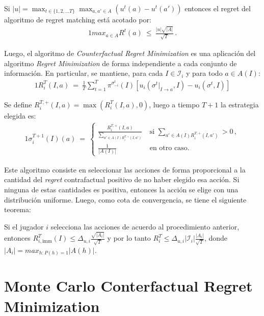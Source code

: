 \begin{theorem}
Si $|u| = \max_{t \in \{1, 2, ... T\}} \max_{a, a' \in A}(u^t(a) - u^t(a'))$ entonces el regret del algoritmo de regret matching está acotado por:
\begin{alignat}{1}
max_{a \in A}R^t(a)\ \leq\ \frac{|u| \sqrt{|A|}}{\sqrt T} \,.
\end{alignat}
\end{theorem}

Luego, el algoritmo de \textit{Counterfactual Regret Minimization} es una aplicación del algoritmo \textit{Regret Minimization} de forma independiente a cada conjunto de información. En particular, se mantiene, para cada $I \in \mathcal{I}_i$ y para todo $a \in A(I)$:
\begin{alignat}{1}
R_i^T(I, a)\ =\ \frac{1}{T} \sum_{t = 1}^T \pi^{\sigma^t_{-i}}(I)[u_i(\sigma^t|_{I \rightarrow a}, I) - u_i(\sigma^t, I)]
\end{alignat}

Se define $R_i^{T, +}(I, a) = \max(R_i^T(I, a), 0)$, luego a tiempo $T+1$ la estrategia elegida es:
\begin{alignat}{1}
\sigma_i^{T+1}(I)(a)\ =\
\begin{cases}
\frac{R_i^{T, +}(I, a)}{\sum_{a' \in A(I) R_i^{T, +}(I, a')}}\ & \text{si } \sum_{a' \in A(I) R_i^{T, +}(I, a')} > 0 \,, \\
\frac{1}{|A(I)|}\ & \text{en otro caso.} 
\end{cases}
\end{alignat}

Este algoritmo consiste en seleccionar las acciones de forma proporcional a la cantidad del \textit{regret} contrafactual positivo de no haber elegido esa acción. Si ninguna de estas cantidades es positiva, entonces la acción se elige con una distribución uniforme. Luego, como cota de convergencia, se tiene el siguiente teorema:
\begin{theorem}
Si el jugador $i$ selecciona las acciones de acuerdo al procedimiento anterior, entonces $R^T_{i, \text{imm}}(I) \leq \Delta_{u, i} \frac{\sqrt{|A_i|}}{\sqrt{T}}$ y por lo tanto $R_i^T \leq \Delta_{u, i} |\mathcal{I}_i| \frac{|A_i|}{\sqrt T}$, donde $|A_i| = max_{h : P(h) = 1}{|A(h)|}$.
\end{theorem}


\section{Monte Carlo Conterfactual Regret Minimization}

